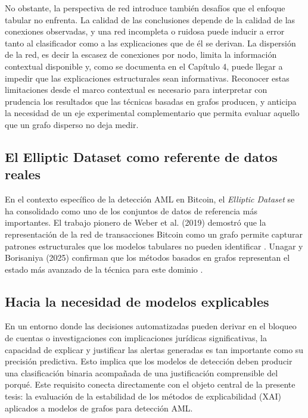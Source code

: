 No obstante, la perspectiva de red introduce también desafíos que el enfoque tabular no enfrenta. La calidad de las conclusiones depende de la calidad de las conexiones observadas, y una red incompleta o ruidosa puede inducir a error tanto al clasificador como a las explicaciones que de él se derivan. La dispersión de la red, es decir la escasez de conexiones por nodo, limita la información contextual disponible y, como se documenta en el Capítulo 4, puede llegar a impedir que las explicaciones estructurales sean informativas. Reconocer estas limitaciones desde el marco contextual es necesario para interpretar con prudencia los resultados que las técnicas basadas en grafos producen, y anticipa la necesidad de un eje experimental complementario que permita evaluar aquello que un grafo disperso no deja medir.

\subsection{El Elliptic Dataset como referente de datos reales}

En el contexto específico de la detección AML en Bitcoin, el \textit{Elliptic Dataset} se ha consolidado como uno de los conjuntos de datos de referencia más importantes. El trabajo pionero de Weber et al. (2019) demostró que la representación de la red de transacciones Bitcoin como un grafo permite capturar patrones estructurales que los modelos tabulares no pueden identificar \cite{Weber2019Anti-MoneyForensics}. Unagar y Borisaniya (2025) confirman que los métodos basados en grafos representan el estado más avanzado de la técnica para este dominio \cite{Unagar2025SurveyXAI}.

\subsection{Hacia la necesidad de modelos explicables}

En un entorno donde las decisiones automatizadas pueden derivar en el bloqueo de cuentas o investigaciones con implicaciones jurídicas significativas, la capacidad de explicar y justificar las alertas generadas es tan importante como su precisión predictiva. Esto implica que los modelos de detección deben producir una clasificación binaria acompañada de una justificación comprensible del porqué. Este requisito conecta directamente con el objeto central de la presente tesis: la evaluación de la estabilidad de los métodos de explicabilidad (XAI) aplicados a modelos de grafos para detección AML.
